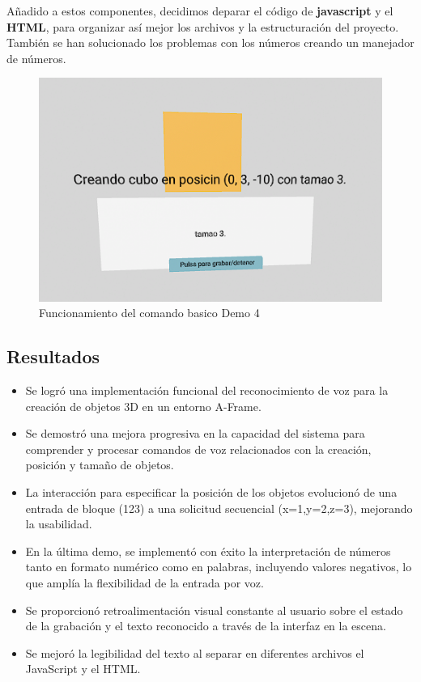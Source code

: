 \documentclass[a4paper, 12pt]{book}
\begin{document}
Añadido a estos componentes, decidimos deparar el código de \textbf{javascript} y el \textbf{HTML}, para organizar así mejor los archivos y la estructuración del proyecto.
También se han solucionado los problemas con los números creando un manejador de números.
\begin{figure}[H]  %
  \centering
  \includegraphics[width=0.7\linewidth]{img/comandoDemo4.png}  %
  \caption{Funcionamiento del comando basico Demo 4}  %
  \label{fig:comandDemo4}  %
\end{figure} 


\subsection{Resultados}
\begin{itemize}
 \item Se logró una implementación funcional del reconocimiento de voz para la creación de objetos 3D en un entorno A-Frame.
 \item Se demostró una mejora progresiva en la capacidad del sistema para comprender y procesar comandos de voz relacionados con la creación, posición y tamaño de objetos.
 \item La interacción para especificar la posición de los objetos evolucionó de una entrada de bloque (123) a una solicitud secuencial (x=1,y=2,z=3), mejorando la usabilidad.
 \item En la última demo, se implementó con éxito la interpretación de números tanto en formato numérico como en palabras, incluyendo valores negativos, lo que amplía la flexibilidad de la entrada por voz.
 \item Se proporcionó retroalimentación visual constante al usuario sobre el estado de la grabación y el texto reconocido a través de la interfaz en la escena.
 \item Se mejoró la legibilidad del texto al separar en diferentes archivos el JavaScript y el HTML.
\end{itemize}
\end{document}
